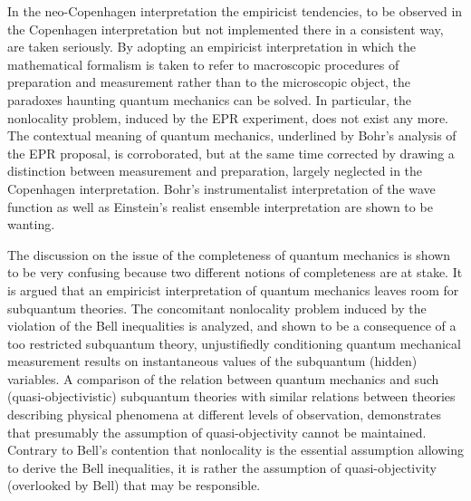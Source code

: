 \documentclass[12pt]{article}
\begin{document}
In the neo-Copenhagen interpretation the empiricist tendencies, to
be observed in the Copenhagen interpretation but not implemented
there in a consistent way, are taken seriously. By adopting an
empiricist interpretation in which the mathematical formalism is
taken to refer to macroscopic procedures of preparation and
measurement rather than to the microscopic object, the paradoxes
haunting quantum mechanics can be solved. In particular, the
nonlocality problem, induced by the EPR experiment, does not exist
any more. The contextual meaning of quantum mechanics, underlined
by Bohr's analysis of the EPR proposal, is corroborated, but at
the same time corrected by drawing a distinction between
measurement and preparation, largely neglected in the Copenhagen
interpretation. Bohr's instrumentalist interpretation of the wave
function as well as Einstein's realist ensemble interpretation are
shown to be wanting.

The discussion on the issue of the completeness of quantum
mechanics is shown to be very confusing because two different
notions of completeness are at stake. It is argued that an
empiricist interpretation of quantum mechanics leaves room for
subquantum theories. The concomitant nonlocality problem induced
by the violation of the Bell inequalities is analyzed, and shown
to be a consequence of a too restricted subquantum theory,
unjustifiedly conditioning quantum mechanical measurement results
on instantaneous values of the subquantum (hidden) variables. A
comparison of the relation between quantum mechanics and such
(quasi-objectivistic) subquantum theories with similar relations
between theories describing physical phenomena at different levels
of observation, demonstrates that presumably the assumption of
quasi-objectivity cannot be maintained. Contrary to Bell's
contention that nonlocality is the essential assumption allowing
to derive the Bell inequalities, it is rather the assumption of
quasi-objectivity (overlooked by Bell) that may be responsible.


\bigskip\bigskip

\end{document}
